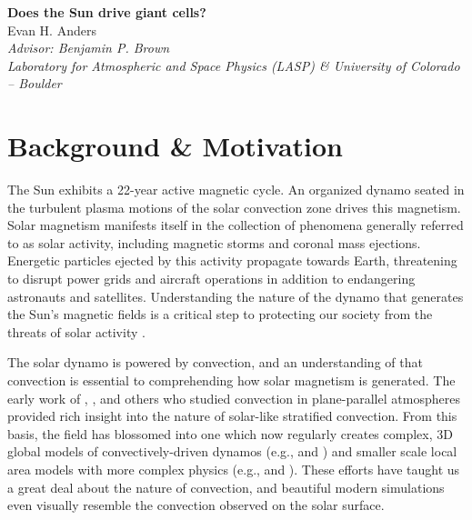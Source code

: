 \documentclass[aasms,12pt]{article}
\begin{document}
\begin{center}
   \large\textbf{Does the Sun drive giant cells?}\\
   \vspace{0.2cm}
   \large{Evan H. Anders}\\
   \vspace{0.2cm}
   \normalsize\textit{Advisor: Benjamin P. Brown}\\
   \normalsize\textit{Laboratory for Atmospheric and Space Physics (LASP) \& University of Colorado -- Boulder}\\
\end{center}

\vspace{-0.6cm}
\section{Background \& Motivation}
The Sun exhibits a 22-year active magnetic cycle.
An organized dynamo seated in the turbulent plasma
motions of the solar convection zone drives this magnetism.
Solar magnetism manifests itself in the collection of phenomena generally
referred to as solar activity, including magnetic storms and coronal mass
ejections.  Energetic particles ejected by this activity propagate towards Earth, 
threatening to disrupt power grids and aircraft operations in addition to endangering astronauts and satellites.
Understanding the nature of the dynamo that generates the Sun's magnetic fields is a critical
step to protecting our society from the threats of solar activity \citep{charbonneau2014}.

The solar dynamo is powered by convection, and
an understanding of that convection is essential to comprehending
how solar magnetism is generated. The early work of \cite{graham1975}, \cite{hurlburt&all1984},
and others who studied convection in plane-parallel atmospheres
provided rich insight into the nature of solar-like stratified convection.  From this basis,
the field has blossomed into one which now regularly creates complex, 3D global models of convectively-driven
dynamos (e.g., \cite{brown&all2010} and \cite{guerrero&all2016})
and smaller scale local area models with more complex physics 
(e.g., \cite{stein&nordlund2012} and \cite{rempel2014}).
These efforts have taught us a great deal about the nature of convection, and
beautiful modern simulations even visually resemble the convection observed on the solar surface.
\end{document}
